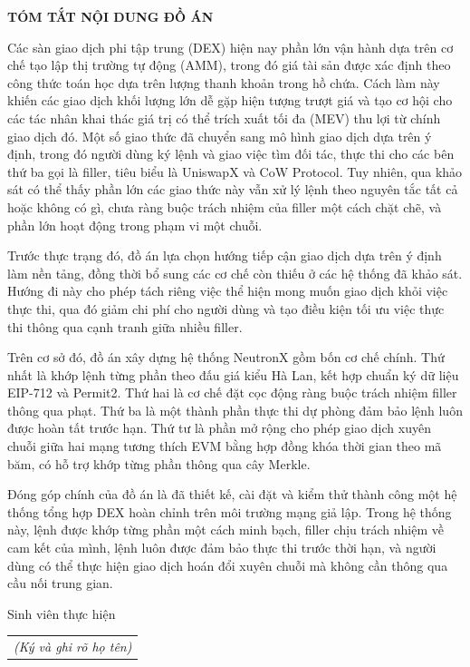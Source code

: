 \documentclass[../DoAn.tex]{subfiles}
\begin{document}
\begin{center}
    \Large{\textbf{TÓM TẮT NỘI DUNG ĐỒ ÁN}}\\
\end{center}
\vspace{1cm}
Các sàn giao dịch phi tập trung (DEX) hiện nay phần lớn vận hành dựa trên cơ chế tạo lập thị trường tự động (AMM), trong đó giá tài sản được xác định theo công thức toán học dựa trên lượng thanh khoản trong hồ chứa. Cách làm này khiến các giao dịch khối lượng lớn dễ gặp hiện tượng trượt giá và tạo cơ hội cho các tác nhân khai thác giá trị có thể trích xuất tối đa (MEV) thu lợi từ chính giao dịch đó. Một số giao thức đã chuyển sang mô hình giao dịch dựa trên ý định, trong đó người dùng ký lệnh và giao việc tìm đối tác, thực thi cho các bên thứ ba gọi là filler, tiêu biểu là UniswapX và CoW Protocol. Tuy nhiên, qua khảo sát có thể thấy phần lớn các giao thức này vẫn xử lý lệnh theo nguyên tắc tất cả hoặc không có gì, chưa ràng buộc trách nhiệm của filler một cách chặt chẽ, và phần lớn hoạt động trong phạm vi một chuỗi.

Trước thực trạng đó, đồ án lựa chọn hướng tiếp cận giao dịch dựa trên ý định làm nền tảng, đồng thời bổ sung các cơ chế còn thiếu ở các hệ thống đã khảo sát. Hướng đi này cho phép tách riêng việc thể hiện mong muốn giao dịch khỏi việc thực thi, qua đó giảm chi phí cho người dùng và tạo điều kiện tối ưu việc thực thi thông qua cạnh tranh giữa nhiều filler.

Trên cơ sở đó, đồ án xây dựng hệ thống NeutronX gồm bốn cơ chế chính. Thứ nhất là khớp lệnh từng phần theo đấu giá kiểu Hà Lan, kết hợp chuẩn ký dữ liệu EIP-712 và Permit2. Thứ hai là cơ chế đặt cọc động ràng buộc trách nhiệm filler thông qua phạt. Thứ ba là một thành phần thực thi dự phòng đảm bảo lệnh luôn được hoàn tất trước hạn. Thứ tư là phần mở rộng cho phép giao dịch xuyên chuỗi giữa hai mạng tương thích EVM bằng hợp đồng khóa thời gian theo mã băm, có hỗ trợ khớp từng phần thông qua cây Merkle.

Đóng góp chính của đồ án là đã thiết kế, cài đặt và kiểm thử thành công một hệ thống tổng hợp DEX hoàn chỉnh trên môi trường mạng giả lập. Trong hệ thống này, lệnh được khớp từng phần một cách minh bạch, filler chịu trách nhiệm về cam kết của mình, lệnh luôn được đảm bảo thực thi trước thời hạn, và người dùng có thể thực hiện giao dịch hoán đổi xuyên chuỗi mà không cần thông qua cầu nối trung gian.
\begin{flushright}
Sinh viên thực hiện\\
\begin{tabular}{@{}c@{}}
\textit{(Ký và ghi rõ họ tên)}
\end{tabular}
\end{flushright}
\end{document}
